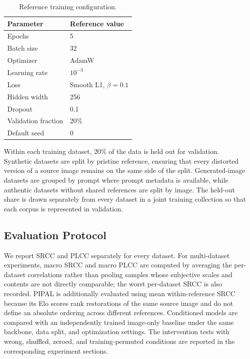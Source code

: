 \documentclass{article}
\begin{document}
\begin{table}[htbp]
\centering
\small
\begin{tabular}{ll}
\hline
Parameter & Reference value \\
\hline
Epochs & 5 \\
Batch size & 32 \\
Optimizer & AdamW \\
Learning rate & $10^{-3}$ \\
Loss & Smooth L1, $\beta=0.1$ \\
Hidden width & 256 \\
Dropout & 0.1 \\
Validation fraction & 20\% \\
Default seed & 0 \\
\hline
\end{tabular}
\caption{Reference training configuration.}
\label{tab:training-parameters}
\end{table}

Within each training dataset, 20\% of the data is held out for validation. Synthetic datasets are split by pristine reference, ensuring that every distorted version of a source image remains on the same side of the split. Generated-image datasets are grouped by prompt where prompt metadata is available, while authentic datasets without shared references are split by image. The held-out share is drawn separately from every dataset in a joint training collection so that each corpus is represented in validation.

\subsection{Evaluation Protocol}

We report SRCC and PLCC separately for every dataset. For multi-dataset experiments, macro SRCC and macro PLCC are computed by averaging the per-dataset correlations rather than pooling samples whose subjective scales and contents are not directly comparable; the worst per-dataset SRCC is also recorded. PIPAL is additionally evaluated using mean within-reference SRCC because its Elo scores rank restorations of the same source image and do not define an absolute ordering across different references. Conditioned models are compared with an independently trained image-only baseline under the same backbone, data split, and optimization settings. The intervention tests with wrong, shuffled, zeroed, and training-permuted conditions are reported in the corresponding experiment sections.
\end{document}
